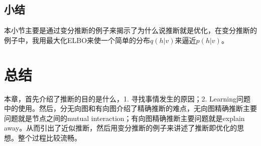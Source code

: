 \documentclass[a4paper]{article}
\begin{document}
\subsection{小结}
本小节主要是通过变分推断的例子来揭示了为什么说推断就是优化，在变分推断的例子中，我用最大化ELBO来使一个简单的分布$q(h|v)$来逼近$p(h|v)$。

\section{总结}
本章，首先介绍了推断的目的是什么，1. 寻找事情发生的原因；2. Learning问题中的使用。然后，分无向图和有向图介绍了精确推断的难点，无向图精确推断主要问题就是节点之间的mutual interaction；有向图精确推断主要问题就是explain away。从而引出了近似推断，然后用变分推断的例子来讲述了推断即优化的思想。整个过程比较流畅。
\end{document}
